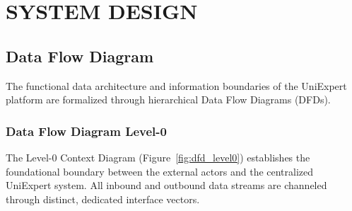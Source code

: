 \chapter{SYSTEM DESIGN}
\label{ch:system_design}

\section{Data Flow Diagram}
\label{sec:dfd}

The functional data architecture and information boundaries of the UniExpert platform are formalized through hierarchical Data Flow Diagrams (DFDs).

\subsection{Data Flow Diagram Level-0}
\label{subsec:dfd_level0}

The Level-0 Context Diagram (Figure~\ref{fig:dfd_level0}) establishes the foundational boundary between the external actors and the centralized UniExpert system. All inbound and outbound data streams are channeled through distinct, dedicated interface vectors.


